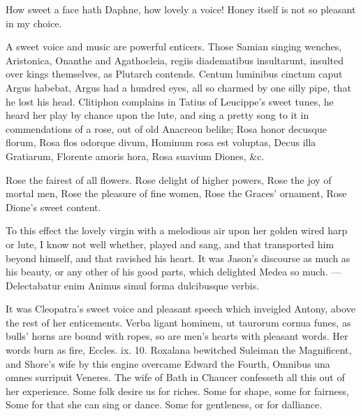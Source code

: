 {How sweet a face hath Daphne, how lovely a voice!
Honey itself is not so pleasant in my choice.

A sweet voice and music are powerful enticers. Those Samian singing
wenches, Aristonica, Onanthe and Agathocleia, regiis diadematibus
insultarunt, insulted over kings themselves, as Plutarch
contends. Centum luminibus cinctum caput Argus habebat, Argus had a
hundred eyes, all so charmed by one silly pipe, that he lost his head.
Clitiphon complains in Tatius of Leucippe's sweet tunes, he heard
her play by chance upon the lute, and sing a pretty song to it in
commendations of a rose, out of old Anacreon belike;
Rosa honor decusque florum,
Rosa flos odorque divum,
Hominum rosa est voluptas,
Decus illa Gratiarum,
Florente amoris hora,
Rosa suavium Diones, \&c.

Rose the fairest of all flowers.
Rose delight of higher powers,
Rose the joy of mortal men,
Rose the pleasure of fine women,
Rose the Graces' ornament,
Rose Dione's sweet content.

To this effect the lovely virgin with a melodious air upon her golden
wired harp or lute, I know not well whether, played and sang, and that
transported him beyond himself, and that ravished his heart. It was
Jason's discourse as much as his beauty, or any other of his good
parts, which delighted Medea so much.
---Delectabatur enim
Animus simul forma dulcibusque verbis.

It was Cleopatra's sweet voice and pleasant speech which inveigled
Antony, above the rest of her enticements. Verba ligant hominem, ut
taurorum cornua funes, as bulls' horns are bound with ropes, so are
men's hearts with pleasant words. Her words burn as fire, Eccles. ix.
10. Roxalana bewitched Suleiman the Magnificent, and Shore's wife by
this engine overcame Edward the Fourth, Omnibus una omnes
surripuit Veneres. The wife of Bath in Chaucer confesseth all this out
of her experience.
Some folk desire us for riches.
Some for shape, some for fairness,
Some for that she can sing or dance.
Some for gentleness, or for dalliance.

}
